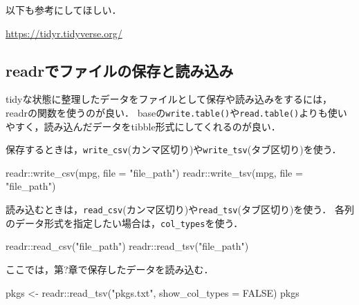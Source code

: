 \documentclass[
]{article}
\newenvironment{Shaded}{\begin{snugshade}}{\end{snugshade}}
\newcommand{\AttributeTok}[1]{\textcolor[rgb]{0.77,0.63,0.00}{#1}}
\newcommand{\ConstantTok}[1]{\textcolor[rgb]{0.00,0.00,0.00}{#1}}
\newcommand{\FunctionTok}[1]{\textcolor[rgb]{0.00,0.00,0.00}{#1}}
\newcommand{\NormalTok}[1]{#1}
\newcommand{\OtherTok}[1]{\textcolor[rgb]{0.56,0.35,0.01}{#1}}
\newcommand{\SpecialCharTok}[1]{\textcolor[rgb]{0.00,0.00,0.00}{#1}}
\newcommand{\StringTok}[1]{\textcolor[rgb]{0.31,0.60,0.02}{#1}}
\begin{document}
以下も参考にしてほしい．

\url{https://tidyr.tidyverse.org/}

\hypertarget{readrux3067ux30d5ux30a1ux30a4ux30ebux306eux4fddux5b58ux3068ux8aadux307fux8fbcux307f}{%
\subsection{readrでファイルの保存と読み込み}\label{readrux3067ux30d5ux30a1ux30a4ux30ebux306eux4fddux5b58ux3068ux8aadux307fux8fbcux307f}}

tidyな状態に整理したデータをファイルとして保存や読み込みをするには，readrの関数を使うのが良い．
baseの\texttt{write.table()}や\texttt{read.table()}よりも使いやすく，読み込んだデータをtibble形式にしてくれるのが良い．

保存するときは，\texttt{write\_csv}(カンマ区切り)や\texttt{write\_tsv}(タブ区切り)を使う．

\begin{Shaded}
\begin{Highlighting}[]
\NormalTok{readr}\SpecialCharTok{::}\FunctionTok{write\_csv}\NormalTok{(mpg, }\AttributeTok{file =} \StringTok{"file\_path"}\NormalTok{)}
\NormalTok{readr}\SpecialCharTok{::}\FunctionTok{write\_tsv}\NormalTok{(mpg, }\AttributeTok{file =} \StringTok{"file\_path"}\NormalTok{)}
\end{Highlighting}
\end{Shaded}

読み込むときは，\texttt{read\_csv}(カンマ区切り)や\texttt{read\_tsv}(タブ区切り)を使う．
各列のデータ形式を指定したい場合は，\texttt{col\_types}を使う．

\begin{Shaded}
\begin{Highlighting}[]
\NormalTok{readr}\SpecialCharTok{::}\FunctionTok{read\_csv}\NormalTok{(}\StringTok{"file\_path"}\NormalTok{)}
\NormalTok{readr}\SpecialCharTok{::}\FunctionTok{read\_tsv}\NormalTok{(}\StringTok{"file\_path"}\NormalTok{)}
\end{Highlighting}
\end{Shaded}

ここでは，第?章で保存したデータを読み込む．

\begin{Shaded}
\begin{Highlighting}[]
\NormalTok{pkgs }\OtherTok{\textless{}{-}}\NormalTok{ readr}\SpecialCharTok{::}\FunctionTok{read\_tsv}\NormalTok{(}\StringTok{"pkgs.txt"}\NormalTok{, }\AttributeTok{show\_col\_types =} \ConstantTok{FALSE}\NormalTok{)}
\NormalTok{pkgs}
\end{Highlighting}
\end{Shaded}
\end{document}
